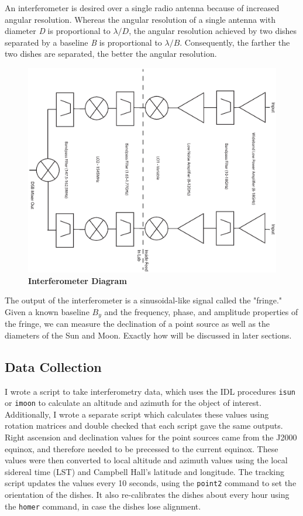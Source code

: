 \documentclass{article}
\begin{document}
An interferometer is desired over a single radio antenna because of increased angular resolution. Whereas the angular resolution of a single antenna with diameter \textit{D} is proportional to $\lambda/D$, the angular resolution achieved by two dishes separated by a baseline \textit{B} is proportional to $\lambda/B$. Consequently, the farther the two dishes are separated, the better the angular resolution.

\begin{figure}[h!]
 \begin{center}
    \includegraphics[width=5in, angle=90]{interf.ps}
    \caption{\bf{Interferometer Diagram}}
    \label{fig:interf}
     \end{center}
    \end{figure}
\newpage

The output of the interferometer is a sinusoidal-like signal called the "fringe."  Given a known baseline \textit{$B_y$} and the frequency, phase, and amplitude properties of the fringe, we can measure the declination of a point source as well as the diameters of the Sun and Moon. Exactly how will be discussed in later sections.

\subsection{Data Collection}
I wrote a script to take interferometry data, which uses the IDL procedures \texttt{isun} or \texttt{imoon} to calculate an altitude and azimuth for the object of interest. Additionally, I wrote a separate script which calculates these values using rotation matrices and double checked that each script gave the same outputs. Right ascension and declination values for the point sources came from the J2000 equinox, and therefore needed to be precessed to the current equinox. These values were then converted to local altitude and azimuth values using the local sidereal time (LST) and Campbell Hall's latitude and longitude. 
The tracking script updates the values every 10 seconds, using the \texttt{point2} command to set the orientation of the dishes. It also re-calibrates the dishes about every hour using the \texttt{homer} command, in case the dishes lose alignment.
\end{document}
